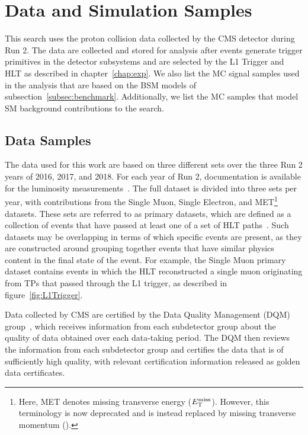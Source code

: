 
\section{Data and Simulation Samples}
\label{sec:samples}

This search uses the proton collision data collected by the CMS detector during Run 2.
The data are collected and stored for analysis after events generate trigger primitives in the detector subsystems and are selected by the L1 Trigger and HLT as described in chapter~\ref{chap:exp}.
We also list the MC signal samples used in the analysis that are based on the BSM models of subsection~\ref{subsec:benchmark}.
Additionally, we list the MC samples that model SM background contributions to the search.

\subsection{Data Samples}

The data used for this work are based on three different sets over the three Run 2 years of 2016, 2017, and 2018.
For each year of Run 2, documentation is available for the luminosity measurements~\cite{CMS-PAS-LUM-17-001,CMS-PAS-LUM-17-004,CMS-PAS-LUM-18-002}.
The full dataset is divided into three sets per year, with contributions from the Single Muon, Single Electron, and MET\footnote{Here, MET denotes missing transverse energy ($E_\mathrm{T}^\mathrm{miss}$).
However, this terminology is now deprecated and is instead replaced by missing transverse momentum (\ptmiss).} datasets.
These sets are referred to as primary datasets, which are defined as a collection of events that have passed at least one of a set of HLT paths~\cite{Franzoni2016}.
Such datasets may be overlapping in terms of which specific events are present, as they are constructed around grouping together events that have similar physics content in the final state of the event.
For example, the Single Muon primary dataset contains events in which the HLT reconstructed a single muon originating from TPs that passed through the L1 trigger, as described in figure~\ref{fig:L1Trigger}.

Data collected by CMS are certified by the Data Quality Management (DQM) group~\cite{CMSData}, which receives information from each subdetector group about the quality of data obtained over each data-taking period.
The DQM then reviews the information from each subdetector group and certifies the data that is of sufficiently high quality, with relevant certification information released as golden data certificates.

